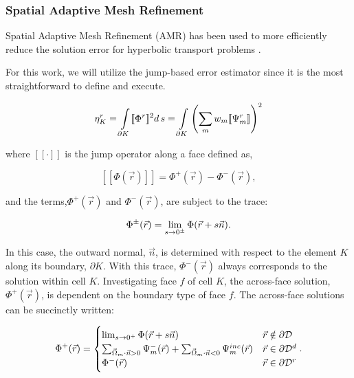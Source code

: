 \subsubsection{Spatial Adaptive Mesh Refinement}
\label{sec::Sn_Solution_Spatial_AMR}

Spatial Adaptive Mesh Refinement (AMR) has been used to more efficiently reduce the solution error for hyperbolic transport problems \cite{fuhrer1997posteriori,hartmann2002adaptive,dedner2002adaptive,hartmann2003adaptive,ragusa2010two,wang2011standard}. 

For this work, we will utilize the jump-based error estimator since it is the most straightforward to define and execute.

\begin{equation}
\label{eq::Sn_AMR_jump_err_est}
\eta_K^r = \int\displaylimits_{\partial K} [\![ \Phi^r ]\!]^2 d \, s = \int\displaylimits_{\partial K} \left(  \sum_m w_m [\![ \Psi_m^r ]\!]  \right)^2
\end{equation}

\noindent where $[\![ \cdot ]\!]$ is the jump operator along a face defined as,

\begin{equation}
\label{eq::Sn_AMR_jump_def}
[\![ \Phi (\vec{r}) ]\!] = \Phi^+ (\vec{r}) - \Phi^- (\vec{r}),
\end{equation}

\noindent and the terms,$\Phi^+ (\vec{r})$ and $\Phi^- (\vec{r})$, are subject to the trace:

\begin{equation}
\label{eq::Sn_AMR_jump_trace}
\Phi^{\pm} (\vec{r})  = \lim\displaylimits_{s \rightarrow 0^{\pm}} \Phi (\vec{r} + s \vec{n}).
\end{equation}

\noindent In this case, the outward normal, $\vec{n}$, is determined with respect to the element $K$ along its boundary, $\partial K$. With this trace, $\Phi^- (\vec{r})$ always corresponds to the solution within cell $K$. Investigating face $f$ of cell $K$, the across-face solution, $\Phi^+ (\vec{r})$, is dependent on the boundary type of face $f$. The across-face solutions can be succinctly written:

\begin{equation}
\label{eq::Sn_AMR_across_face_vals}
\Phi^+ (\vec{r}) = 
\begin{cases}
\lim\displaylimits_{s \rightarrow 0^{+}} \Phi (\vec{r} + s \vec{n}) & \vec{r} \notin \partial \mathcal{D} \\
\sum\displaylimits_{\vec{\Omega}_m \cdot \vec{n} > 0}  \Psi_m^- (\vec{r}) + \sum\displaylimits_{\vec{\Omega}_m \cdot \vec{n} < 0} \Psi_{m}^{inc} (\vec{r}) & \vec{r} \in \partial \mathcal{D}^d \\
\Phi^- (\vec{r}) & \vec{r} \in \partial \mathcal{D}^r
\end{cases}.
\end{equation}

